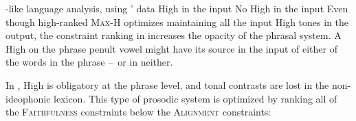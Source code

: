 \documentclass[output=paper
,newtxmath
,modfonts
,nonflat]{langsci/langscibook}
\begin{document}
\ea\label{ex:downing:22}-like language analysis, using ’ data
\ea\label{ex:downing:22a} High  in the input
\sn
\ex\label{ex:downing:22b}No High  in the input 
\z
\z
Even though high-ranked \textsc{Max-H} optimizes maintaining all the input High tones in the output, the constraint ranking in  increases the opacity of the phrasal  system. A High  on the phrase penult vowel might have its source in the input of either of the words in the phrase –~or in neither.

In , High  is obligatory at the phrase level, and tonal contrasts are lost in the non-ideophonic lexicon. This type of prosodic system is optimized by ranking all of the \textsc{Faithfulness} constraints below the \textsc{Alignment} constraints:
\begin{comment}
\ea 
 \gll \\
   \\
 \glt
\z
\end{comment}
\end{document}
